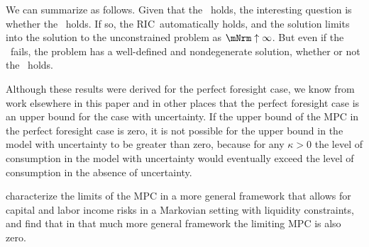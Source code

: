 \documentclass[\econtexRoot/BufferStockTheory]{subfiles}
\newcommand{\subname}{ApndxLiqConstr}
\begin{document}
We can summarize as follows.
Given that the \GICRaw~holds, the interesting question is whether the \FHWC~holds.
If so, the RIC~automatically holds, and the solution limits into the solution to the unconstrained problem as $\mNrm \uparrow \infty$.
But even if the \FHWC~fails, the problem has a well-defined and nondegenerate solution, whether or not the \RIC~holds.

Although these results were derived for the perfect foresight case, we know from work elsewhere in this paper and in other places that the perfect foresight case is an upper bound for the case with uncertainty.
If the upper bound of the MPC in the perfect foresight case is zero, it is not possible for the upper bound in the model with uncertainty to be greater than zero, because for any $\kappa > 0$ the level of consumption in the model with uncertainty would eventually exceed the level of consumption in the absence of uncertainty.

\cite{maTodaRich} characterize the limits of the MPC in a more general framework that allows for capital and labor income risks in a Markovian setting with liquidity constraints, and find that in that much more general framework the limiting MPC is also zero.%

\end{document}
